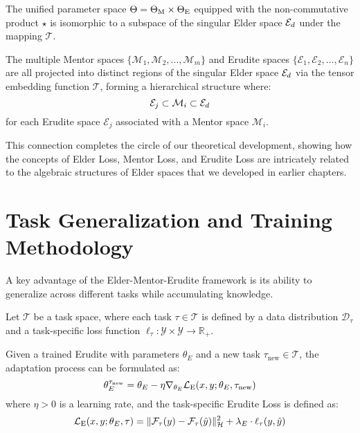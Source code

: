 \begin{theorem}
The unified parameter space $\Theta = \Theta_{\text{M}} \times \Theta_{\text{E}}$ equipped with the non-commutative product $\star$ is isomorphic to a subspace of the singular Elder space $\mathcal{E}_{d}$ under the mapping $\mathcal{T}$.
\end{theorem}

\begin{corollary}
The multiple Mentor spaces $\{\mathcal{M}_1, \mathcal{M}_2, \ldots, \mathcal{M}_m\}$ and Erudite spaces $\{\mathcal{E}_1, \mathcal{E}_2, \ldots, \mathcal{E}_n\}$ are all projected into distinct regions of the singular Elder space $\mathcal{E}_{d}$ via the tensor embedding function $\mathcal{T}$, forming a hierarchical structure where:
\begin{equation}
\mathcal{E}_j \subset \mathcal{M}_i \subset \mathcal{E}_{d}
\end{equation}
for each Erudite space $\mathcal{E}_j$ associated with a Mentor space $\mathcal{M}_i$.
\end{corollary}

This connection completes the circle of our theoretical development, showing how the concepts of Elder Loss, Mentor Loss, and Erudite Loss are intricately related to the algebraic structures of Elder spaces that we developed in earlier chapters.

\section{Task Generalization and Training Methodology}

A key advantage of the Elder-Mentor-Erudite framework is its ability to generalize across different tasks while accumulating knowledge.

\begin{definition}
Let $\mathcal{T}$ be a task space, where each task $\tau \in \mathcal{T}$ is defined by a data distribution $\mathcal{D}_\tau$ and a task-specific loss function $\ell_\tau: \mathcal{Y} \times \mathcal{Y} \rightarrow \mathbb{R}_+$.
\end{definition}

\begin{theorem}
Given a trained Erudite with parameters $\theta_E$ and a new task $\tau_{\text{new}} \in \mathcal{T}$, the adaptation process can be formulated as:
\begin{equation}
\theta_E^{\tau_{\text{new}}} = \theta_E - \eta \nabla_{\theta_E} \mathcal{L}_{\text{E}}(x, y; \theta_E, \tau_{\text{new}})
\end{equation}
where $\eta > 0$ is a learning rate, and the task-specific Erudite Loss is defined as:
\begin{equation}
\mathcal{L}_{\text{E}}(x, y; \theta_E, \tau) = \| \mathcal{F}_\tau(y) - \mathcal{F}_\tau(\hat{y}) \|_{\mathcal{H}}^2 + \lambda_E \cdot \ell_\tau(y, \hat{y})
\end{equation}
\end{theorem}

